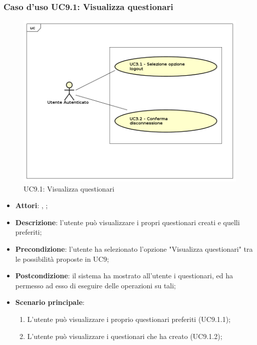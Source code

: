 	\subsubsection{Caso d'uso UC9.1: Visualizza questionari}
	\label{UC9.1}
	\begin{figure}[h]
		\centering
	\includegraphics[scale=0.7,keepaspectratio]{UML/UC9.png}
		\caption{UC9.1: Visualizza questionari}
	\end{figure}
	\FloatBarrier
	\begin{itemize}
		\item \textbf{Attori}: \uau, \uaupro;
		\item \textbf{Descrizione}: l'utente può visualizzare i propri questionari creati e quelli preferiti; 
		\item \textbf{Precondizione}: l'utente ha selezionato l'opzione "Visualizza questionari" tra le possibilità proposte in UC9;
		\item \textbf{Postcondizione}: il sistema ha mostrato all'utente i questionari, ed ha permesso ad esso di eseguire delle operazioni su tali; 
		\item \textbf{Scenario principale}: 
			\begin{enumerate}
				\item L'utente può visualizzare i proprio questionari preferiti (UC9.1.1);
				\item L'utente può visualizzare i questionari che ha creato (UC9.1.2); 
			\end{enumerate}
	\end{itemize}
	
